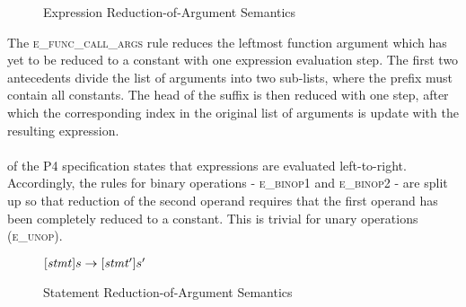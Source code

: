 \documentclass[UTF8]{article}
\begin{document}
\begin{figure}[ht!]
\caption{Expression Reduction-of-Argument Semantics}
\label{fig:semexp2}
\end{figure}

The \textsc{e\_func\_call\_args} rule reduces the leftmost function argument which has yet to be reduced to a constant with one expression evaluation step. The first two antecedents divide the list of arguments into two sub-lists, where the prefix must contain all constants. The head of the suffix is then reduced with one step, after which the corresponding index in the original list of arguments is update with the resulting expression.
\\~\\
 of the P4 specification states that expressions are evaluated left-to-right. Accordingly, the rules for binary operations - \textsc{e\_binop1} and \textsc{e\_binop2} - are split up so that reduction of the second operand requires that the first operand has been completely reduced to a constant. This is trivial for unary operations (\textsc{e\_unop}).

\begin{figure}[ht!]
\begin{ottdefnblock}{$[  \mathit{stmt}  ]  s  \rightarrow  [  \mathit{stmt'}  ]  s'$}{}
\ottusedrule{\ottdrulestmtXXretXXe{}}
\ottusedrule{\ottdrulestmtXXassXXe{}}
\ottusedrule{\ottdrulestmtXXcondXXe{}}
\ottusedrule{\ottdrulestmtXXverifyXXeOne{}}
\ottusedrule{\ottdrulestmtXXverifyXXeTwo{}}
\end{ottdefnblock}
\caption{Statement Reduction-of-Argument Semantics}
\label{fig:semstmt2}
\end{figure}

\printbibliography
\end{document}
